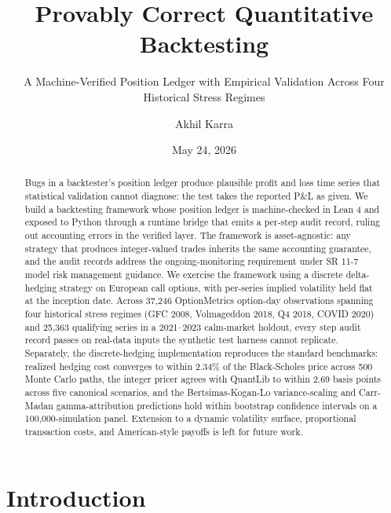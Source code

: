 \documentclass[
  11pt,
  letterpaper,
  DIV=12,
  numbers=noendperiod]{scrartcl}
\title{Provably Correct Quantitative Backtesting}
\subtitle{A Machine-Verified Position Ledger with Empirical Validation
Across Four Historical Stress Regimes}
\author{Akhil Karra}
\date{May 24, 2026}
\numberwithin{equation}{section}
\numberwithin{figure}{section}
\numberwithin{table}{section}
\let\quantproofsoldsection\section
\renewcommand{\section}{\clearpage\quantproofsoldsection}
\renewcommand*\contentsname{Table of contents}
\newcommand\contentsname{Table of contents}
\begin{document}
\maketitle
\begin{abstract}
Bugs in a backtester's position ledger produce plausible profit and loss
time series that statistical validation cannot diagnose: the test takes
the reported P\&L as given. We build a backtesting framework whose
position ledger is machine-checked in Lean 4 and exposed to Python
through a runtime bridge that emits a per-step audit record, ruling out
accounting errors in the verified layer. The framework is
asset-agnostic: any strategy that produces integer-valued trades
inherits the same accounting guarantee, and the audit records address
the ongoing-monitoring requirement under SR 11-7 model risk management
guidance. We exercise the framework using a discrete delta-hedging
strategy on European call options, with per-series implied volatility
held flat at the inception date. Across 37,246 OptionMetrics option-day
observations spanning four historical stress regimes (GFC 2008,
Volmageddon 2018, Q4 2018, COVID 2020) and 25,363 qualifying series in a
2021--2023 calm-market holdout, every step audit record passes on
real-data inputs the synthetic test harness cannot replicate.
Separately, the discrete-hedging implementation reproduces the standard
benchmarks: realized hedging cost converges to within 2.34\% of the
Black-Scholes price across 500 Monte Carlo paths, the integer pricer
agrees with QuantLib to within 2.69 basis points across five canonical
scenarios, and the Bertsimas-Kogan-Lo variance-scaling and Carr-Madan
gamma-attribution predictions hold within bootstrap confidence intervals
on a 100,000-simulation panel. Extension to a dynamic volatility
surface, proportional transaction costs, and American-style payoffs is
left for future work.
\end{abstract}

\renewcommand*\contentsname{Contents}
{
\hypersetup{linkcolor=}
\setcounter{tocdepth}{2}
\tableofcontents
}

\section{Introduction}\label{sec-intro}
\end{document}
